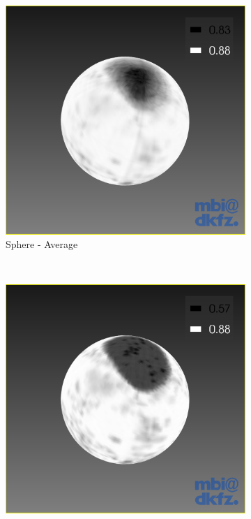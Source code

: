 \begin{figure}[H]
  \centering
  \begin{subfigure}[b]{0.32\textwidth}
    \includegraphics[width=\textwidth]{images/surface/sphere_average.png}
    \caption*{Sphere - Average}
    \label{fig:sphereaverage}
  \end{subfigure}%
  ~ %
  \begin{subfigure}[b]{0.32\textwidth}
    \includegraphics[width=\textwidth]{images/surface/sphere_worst.png}

\end{subfigure}
\end{figure}
